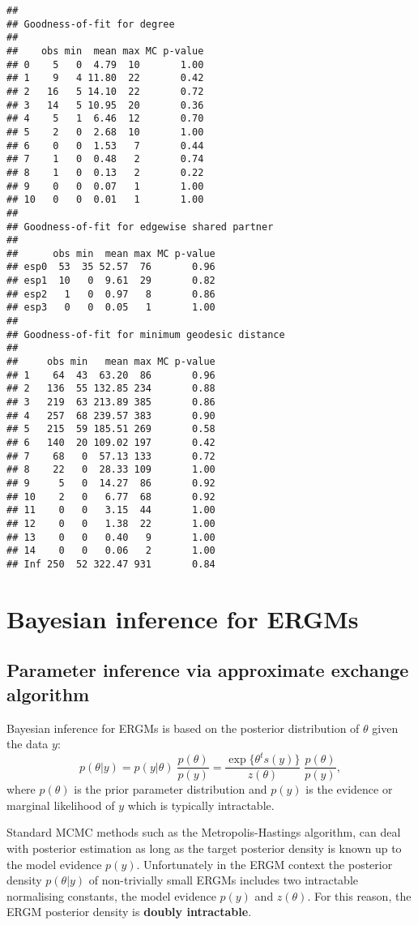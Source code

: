 \documentclass[]{book}
\begin{document}
\begin{verbatim}
## 
## Goodness-of-fit for degree 
## 
##    obs min  mean max MC p-value
## 0    5   0  4.79  10       1.00
## 1    9   4 11.80  22       0.42
## 2   16   5 14.10  22       0.72
## 3   14   5 10.95  20       0.36
## 4    5   1  6.46  12       0.70
## 5    2   0  2.68  10       1.00
## 6    0   0  1.53   7       0.44
## 7    1   0  0.48   2       0.74
## 8    1   0  0.13   2       0.22
## 9    0   0  0.07   1       1.00
## 10   0   0  0.01   1       1.00
## 
## Goodness-of-fit for edgewise shared partner 
## 
##      obs min  mean max MC p-value
## esp0  53  35 52.57  76       0.96
## esp1  10   0  9.61  29       0.82
## esp2   1   0  0.97   8       0.86
## esp3   0   0  0.05   1       1.00
## 
## Goodness-of-fit for minimum geodesic distance 
## 
##     obs min   mean max MC p-value
## 1    64  43  63.20  86       0.96
## 2   136  55 132.85 234       0.88
## 3   219  63 213.89 385       0.86
## 4   257  68 239.57 383       0.90
## 5   215  59 185.51 269       0.58
## 6   140  20 109.02 197       0.42
## 7    68   0  57.13 133       0.72
## 8    22   0  28.33 109       1.00
## 9     5   0  14.27  86       0.92
## 10    2   0   6.77  68       0.92
## 11    0   0   3.15  44       1.00
## 12    0   0   1.38  22       1.00
## 13    0   0   0.40   9       1.00
## 14    0   0   0.06   2       1.00
## Inf 250  52 322.47 931       0.84
\end{verbatim}

\chapter{Bayesian inference for ERGMs}\label{Bayes_ERGMs}

\section{Parameter inference via approximate exchange
algorithm}\label{parameter-inference-via-approximate-exchange-algorithm}

Bayesian inference for ERGMs is based on the posterior distribution of
\(\theta\) given the data \(y\): \[
p(\theta | y) 
= p(y | \theta)\; \frac{p(\theta)}{p(y)} 
= \frac{ \exp \{ \theta^t s(y)\} }
       {z(\theta)}\; \frac{p(\theta)}{p(y)},
\] where \(p(\theta)\) is the prior parameter distribution and \(p(y)\)
is the evidence or marginal likelihood of \(y\) which is typically
intractable.

Standard MCMC methods such as the Metropolis-Hastings algorithm, can
deal with posterior estimation as long as the target posterior density
is known up to the model evidence \(p(y)\). Unfortunately in the ERGM
context the posterior density \(p(\theta | y)\) of non-trivially small
ERGMs includes two intractable normalising constants, the model evidence
\(p(y)\) and \(z(\theta)\). For this reason, the ERGM posterior density
is \textbf{doubly intractable}.
\end{document}
